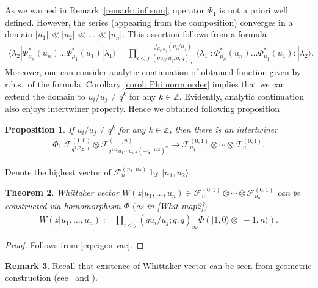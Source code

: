 \documentclass[pdftex]{sigma}
\numberwithin{equation}{section}
\newtheorem{Theorem}{Theorem}[section]
\newtheorem{Proposition}[Theorem]{Proposition}
\theoremstyle{definition}
\newtheorem{Remark}[Theorem]{Remark}
\begin{document}
As we warned in Remark~\ref{remark: inf sum}, operator $\tilde{\Phi}_1$ is not a priori well defined. However, the series (appearing from the composition) converges in a domain $|u_1| \ll |u_{2}| \ll \dots \ll |u_n|$. This assertion follows from a formula
\begin{gather*}
\langle \lambda_2 | \Phi_{\mu_n}^*(u_n) \dots \Phi_{\mu_1}^*(u_1) | \lambda_1 \rangle = \prod_{i<j} \frac{f_{\mu_i, \mu_j}(u_i/u_j)}{\left(q u_i/u_j; q, q \right)_{\infty}} \,\langle \lambda_1 | :\!\Phi_{\mu_n}^*(u_n) \dots \Phi_{\mu_1}^*(u_1)\!: | \lambda_2 \rangle.
\end{gather*}
Moreover, one can consider analytic continuation of obtained function given by r.h.s.\ of the formula. Corollary \ref{corol: Phi norm order} implies that we can extend the domain to $u_i/u_j \neq q^k$ for any $k \in \mathbb{Z}$. Evidently, analytic continuation also enjoys intertwiner property. Hence we obtained following proposition

\begin{Proposition}If $u_i/u_j \neq q^k$ for any $k \in \mathbb{Z}$, then there is an intertwiner
\begin{gather} \label{Whit map2}
\tilde{\Phi}\colon \ \mathcal{F}^{(1,0)}_{q^{1/2}z^{-1}} \otimes \mathcal{F}^{(-1,n)}_{q^{1/2} u_1 \cdots u_n z (-q^{-1/2})^n} \rightarrow \mathcal{F}^{(0,1)}_{u_1} \otimes \cdots \otimes \mathcal{F}^{(0,1)}_{u_n}.
\end{gather}
\end{Proposition}

Denote the highest vector of $\mathcal{F}_u^{(n_1,n_2)}$ by $|n_1,n_2 \rangle$.

\begin{Theorem} \label{th:Whit construction}
Whittaker vector $W(z|u_1, \dots, u_n) \in \mathcal{F}^{(0,1)}_{u_1} \otimes \cdots \otimes \mathcal{F}^{(0,1)}_{u_n}$ can be constructed via homomorphism $\tilde{\Phi}$ $($as in \eqref{Whit map2}$)$
\begin{gather*}
W(z|u_1, \dots, u_n) := \prod_{i<j} (q u_i/u_j; q, q )_{\infty} \tilde{\Phi} ( |1,0 \rangle \otimes |-1, n \rangle ).
\end{gather*}
\end{Theorem}

\begin{proof}Follows from \eqref{eq:eigen vac}.
\end{proof}

\begin{Remark}Recall that existence of Whittaker vector can be seen from geometric construction (see~\cite{N12} and \cite{Ts}).
\end{Remark}
\end{document}
